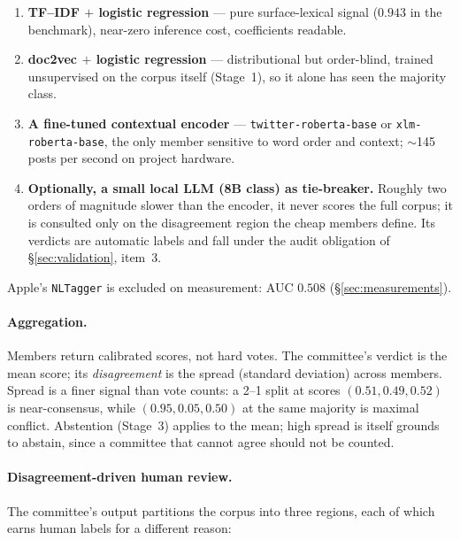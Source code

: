 \documentclass[11pt,a4paper]{article}
\begin{document}
\begin{enumerate}
\item \textbf{TF--IDF $+$ logistic regression} --- pure surface-lexical signal
      ($0.943$ in the benchmark), near-zero inference cost, coefficients readable.
\item \textbf{doc2vec $+$ logistic regression} --- distributional but order-blind,
      trained unsupervised on the corpus itself (Stage~1), so it alone has seen the
      majority class.
\item \textbf{A fine-tuned contextual encoder} --- \texttt{twitter-roberta-base} or
      \texttt{xlm-roberta-base}, the only member sensitive to word order and
      context; $\sim$145 posts per second on project hardware.
\item \textbf{Optionally, a small local LLM (8B class) as tie-breaker.} Roughly two
      orders of magnitude slower than the encoder, it never scores the full corpus;
      it is consulted only on the disagreement region the cheap members define. Its
      verdicts are automatic labels and fall under the audit obligation of
      \S\ref{sec:validation}, item~3.
\end{enumerate}

Apple's \texttt{NLTagger} is excluded on measurement: AUC $0.508$
(\S\ref{sec:measurements}).

\paragraph{Aggregation.} Members return calibrated scores, not hard votes. The
committee's verdict is the mean score; its \emph{disagreement} is the spread
(standard deviation) across members. Spread is a finer signal than vote counts: a
2--1 split at scores $(0.51, 0.49, 0.52)$ is near-consensus, while $(0.95, 0.05,
0.50)$ at the same majority is maximal conflict. Abstention (Stage~3) applies to the
mean; high spread is itself grounds to abstain, since a committee that cannot agree
should not be counted.

\paragraph{Disagreement-driven human review.} The committee's output partitions the
corpus into three regions, each of which earns human labels for a different reason:
\end{document}
